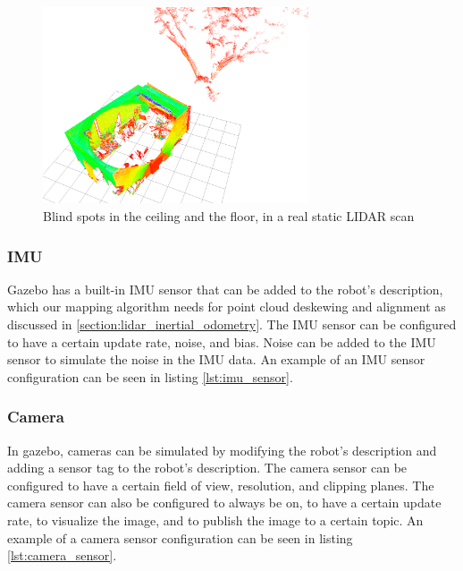 \documentclass[12pt]{article}
\begin{document}
        \begin{figure}[H]
            \centering
            \includegraphics[width=0.7\textwidth]{Images/ldiar_scan_deadzone.png}
            \caption{Blind spots in the ceiling and the floor, in a real static LIDAR scan}
            \label{fig:real_lidar_scan}
        \end{figure}

        \subsubsection{IMU}

        Gazebo has a built-in IMU sensor that can be added to the robot's description, which our mapping algorithm needs for point cloud deskewing and alignment as discussed in \ref{section:lidar_inertial_odometry}. The IMU sensor can be configured to have a certain update rate, noise, and bias. Noise can be added to the IMU sensor to simulate the noise in the IMU data. An example of an IMU sensor configuration can be seen in listing \ref{lst:imu_sensor}.


        \subsubsection{Camera}

        In gazebo, cameras can be simulated by modifying the robot's description and adding a sensor tag to the robot's description. The camera sensor can be configured to have a certain field of view, resolution, and clipping planes. The camera sensor can also be configured to always be on, to have a certain update rate, to visualize the image, and to publish the image to a certain topic. An example of a camera sensor configuration can be seen in listing \ref{lst:camera_sensor}.
\end{document}

